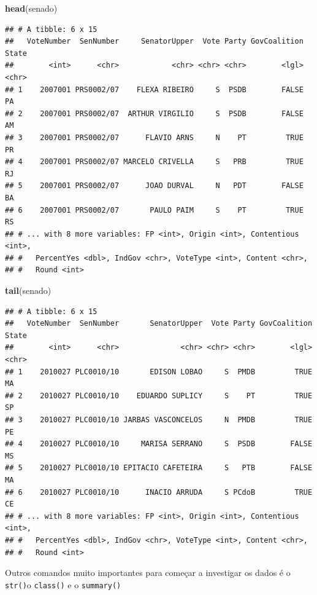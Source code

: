 \documentclass[]{book}
\newenvironment{Shaded}{\begin{snugshade}}{\end{snugshade}}
\newcommand{\KeywordTok}[1]{\textcolor[rgb]{0.13,0.29,0.53}{\textbf{#1}}}
\newcommand{\NormalTok}[1]{#1}
\begin{document}
\begin{Shaded}
\begin{Highlighting}[]
\KeywordTok{head}\NormalTok{(senado)}
\end{Highlighting}
\end{Shaded}

\begin{verbatim}
## # A tibble: 6 x 15
##   VoteNumber  SenNumber     SenatorUpper  Vote Party GovCoalition State
##        <int>      <chr>            <chr> <chr> <chr>        <lgl> <chr>
## 1    2007001 PRS0002/07    FLEXA RIBEIRO     S  PSDB        FALSE    PA
## 2    2007001 PRS0002/07  ARTHUR VIRGILIO     S  PSDB        FALSE    AM
## 3    2007001 PRS0002/07      FLAVIO ARNS     N    PT         TRUE    PR
## 4    2007001 PRS0002/07 MARCELO CRIVELLA     S   PRB         TRUE    RJ
## 5    2007001 PRS0002/07      JOAO DURVAL     N   PDT        FALSE    BA
## 6    2007001 PRS0002/07       PAULO PAIM     S    PT         TRUE    RS
## # ... with 8 more variables: FP <int>, Origin <int>, Contentious <int>,
## #   PercentYes <dbl>, IndGov <chr>, VoteType <int>, Content <chr>,
## #   Round <int>
\end{verbatim}

\begin{Shaded}
\begin{Highlighting}[]
\KeywordTok{tail}\NormalTok{(senado)}
\end{Highlighting}
\end{Shaded}

\begin{verbatim}
## # A tibble: 6 x 15
##   VoteNumber  SenNumber       SenatorUpper  Vote Party GovCoalition State
##        <int>      <chr>              <chr> <chr> <chr>        <lgl> <chr>
## 1    2010027 PLC0010/10       EDISON LOBAO     S  PMDB         TRUE    MA
## 2    2010027 PLC0010/10    EDUARDO SUPLICY     S    PT         TRUE    SP
## 3    2010027 PLC0010/10 JARBAS VASCONCELOS     N  PMDB         TRUE    PE
## 4    2010027 PLC0010/10     MARISA SERRANO     S  PSDB        FALSE    MS
## 5    2010027 PLC0010/10 EPITACIO CAFETEIRA     S   PTB        FALSE    MA
## 6    2010027 PLC0010/10      INACIO ARRUDA     S PCdoB         TRUE    CE
## # ... with 8 more variables: FP <int>, Origin <int>, Contentious <int>,
## #   PercentYes <dbl>, IndGov <chr>, VoteType <int>, Content <chr>,
## #   Round <int>
\end{verbatim}

Outros comandos muito importantes para começar a investigar os dados é o
\texttt{str()}o \texttt{class()} e o \texttt{summary()}
\end{document}
